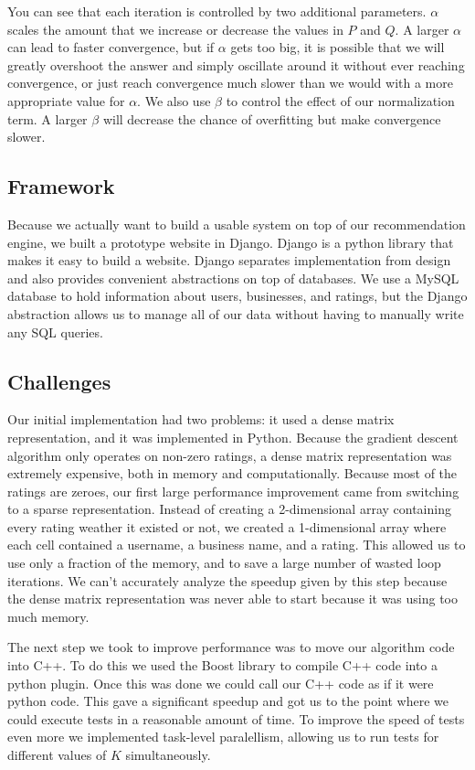 You can see that each iteration is controlled by two additional parameters.
$\alpha$ scales the amount that we increase or decrease the values in $P$ and $Q$. A larger $\alpha$
can lead to faster convergence, but if $\alpha$ gets too big, it is possible that
we will greatly overshoot the answer and simply oscillate around it without ever
reaching convergence, or just reach convergence much slower than we would with a
more appropriate value for $\alpha$. We also use $\beta$ to control the effect
of our normalization term. A larger $\beta$ will decrease the chance of
overfitting but make convergence slower.

\subsection{Framework}

Because we actually want to build a usable system on top of our recommendation
engine, we built a prototype website in Django. Django is a python library that
makes it easy to build a website. Django separates implementation from design
and also provides convenient abstractions on top of databases. We use a MySQL
database to hold information about users, businesses, and ratings, but the
Django abstraction allows us to manage all of our data without having to
manually write any SQL queries.

\subsection{Challenges}

Our initial implementation had two problems: it used a dense matrix
representation, and it was implemented in Python. Because the gradient descent
algorithm only operates on non-zero ratings, a dense matrix representation was
extremely expensive, both in memory and computationally. Because most of the
ratings are zeroes, our first large performance improvement came from switching
to a sparse representation. Instead of creating a 2-dimensional array containing
every rating weather it existed or not, we created a 1-dimensional array where
each cell contained a username, a business name, and a rating. This allowed us
to use only a fraction of the memory, and to save a large number of wasted loop
iterations. We can't accurately analyze the speedup given by this step because
the dense matrix representation was never able to start because it was using too
much memory. 

The next step we took to improve performance was to move our algorithm code into
C++. To do this we used the Boost library to compile C++ code into a python
plugin. Once this was done we could call our C++ code as if it were python code.
This gave a significant speedup and got us to the point where we could execute
tests in a reasonable amount of time. To improve the speed of tests even more we
implemented task-level paralellism, allowing us to run tests for different
values of $K$ simultaneously.

